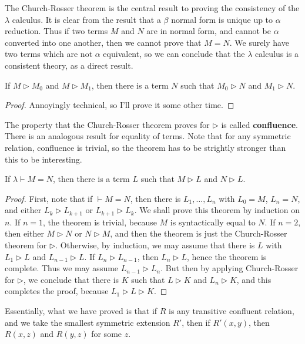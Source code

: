 The Church-Rosser theorem is the central result to proving the consistency of the $\lambda$ calculus. It is clear from the result that a $\beta$ normal form is unique up to $\alpha$ reduction. Thus if two terms $M$ and $N$ are in normal form, and cannot be $\alpha$ converted into one another, then we cannot prove that $M = N$. We surely have two terms which are not $\alpha$ equivalent, so we can conclude that the $\lambda$ calculus is a consistent theory, as a direct result.

\begin{theorem}
    If $M \rhd M_0$ and $M \rhd M_1$, then there is a term $N$ such that $M_0 \rhd N$ and $M_1 \rhd N$.
\end{theorem}
\begin{proof}
    Annoyingly technical, so I'll prove it some other time.
\end{proof}

The property that the Church-Rosser theorem proves for $\rhd$ is called {\bf confluence}. There is an analogous result for equality of terms. Note that for any symmetric relation, confluence is trivial, so the theorem has to be strightly stronger than this to be interesting.

\begin{theorem}
    If $\lambda \vdash M = N$, then there is a term $L$ such that $M \rhd L$ and $N \rhd L$.
\end{theorem}
\begin{proof}
    First, note that if $\vdash M = N$, then there is $L_1, \dots, L_n$ with $L_0 = M$, $L_n = N$, and either $L_k \rhd L_{k+1}$ or $L_{k+1} \rhd L_k$. We shall prove this theorem by induction on $n$. If $n = 1$, the theorem is trivial, because $M$ is syntactically equal to $N$. If $n = 2$, then either $M \rhd N$ or $N \rhd M$, and then the theorem is just the Church-Rosser theorem for $\rhd$. Otherwise, by induction, we may assume that there is $L$ with $L_1 \rhd L$ and $L_{n-1} \rhd L$. If $L_n \rhd L_{n-1}$, then $L_n \rhd L$, hence the theorem is complete. Thus we may assume $L_{n-1} \rhd L_n$. But then by applying Church-Rosser for $\rhd$, we conclude that there is $K$ such that $L \rhd K$ and $L_n \rhd K$, and this completes the proof, because $L_1 \rhd L \rhd K$.
\end{proof}

Essentially, what we have proved is that if $R$ is any transitive confluent relation, and we take the smallest symmetric extension $R'$, then if $R'(x,y)$, then $R(x,z)$ and $R(y,z)$ for some $z$.

